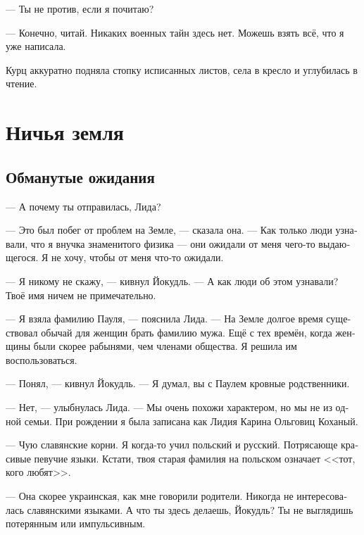 \documentclass[a4paper,10pt,fleqn]{book}\usepackage{polyglossia}\setdefaultlanguage[babelshorthands=true]{russian}\setotherlanguage{english}\defaultfontfeatures{Ligatures=TeX,Mapping=tex-text}\usepackage{xcolor}\newcommand{\ml}[3]{#2}
\begin{document}
\ml{$0$}
{--- Ты не против, если я почитаю?}
{``Would you mind if I read?''}

--- Конечно, читай.
Никаких военных тайн здесь нет.
Можешь взять всё, что я уже написала.

Курц аккуратно подняла стопку исписанных листов, села в кресло и углубилась в чтение.

\chapter{Ничья земля}

\section{Обманутые ожидания}

--- А почему ты отправилась, Лида?

--- Это был побег от проблем на Земле, --- сказала она.
--- Как только люди узнавали, что я внучка знаменитого физика --- они ожидали от меня чего-то выдающегося.
Я не хочу, чтобы от меня что-то ожидали.

--- Я никому не скажу, --- кивнул Йокудль.
--- А как люди об этом узнавали?
Твоё имя ничем не примечательно.

--- Я взяла фамилию Пауля, --- пояснила Лида.
--- На Земле долгое время существовал обычай для женщин брать фамилию мужа.
Ещё с тех времён, когда женщины были скорее рабынями, чем членами общества.
Я решила им воспользоваться.

--- Понял, --- кивнул Йокудль.
--- Я думал, вы с Паулем кровные родственники.

--- Нет, --- улыбнулась Лида.
--- Мы очень похожи характером, но мы не из одной семьи.
\ml{$0$}
{При рождении я была записана как Лидия Карина Ольговиц Коханый.}
{At birth I was registered as Lidia Karina Olgowitz Kochany.''}

\ml{$0$}
{--- Чую славянские корни.}
{``I recognize Slawisch roots.}
Я когда-то учил польский и русский.
Потрясающе красивые певучие языки.
\ml{$0$}
{Кстати, твоя старая фамилия на польском означает <<тот, кого любят>>.}
{By the way, your deadname means `the one who are loved' in Polnisch.''}

\ml{$0$}
{--- Она скорее украинская, как мне говорили родители.}
{``It's more of Ukrainisch, my parents told me.}
\ml{$0$}
{Никогда не интересовалась славянскими языками.}
{I've never been interested in Slawisch languages.}
\ml{$0$}
{А что ты здесь делаешь, Йокудль?}
{What are you doing here, Jökull?}
\ml{$0$}
{Ты не выглядишь потерянным или импульсивным.}
{You don't look lost or impulsive.''}
\end{document}
